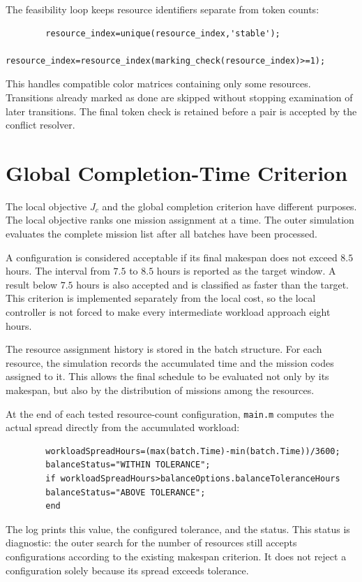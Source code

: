 The feasibility loop keeps resource identifiers separate from token counts:
\begin{small}
	\begin{verbatim}
		resource_index=unique(resource_index,'stable');
		resource_index=resource_index(marking_check(resource_index)>=1);
	\end{verbatim}
\end{small}
This handles compatible color matrices containing only some resources.
Transitions already marked as done are skipped without stopping examination
of later transitions. The final token check is retained before a pair is
accepted by the conflict resolver.

\section{Global Completion-Time Criterion}

The local objective $J_c$ and the global completion criterion have different
purposes. The local objective ranks one mission assignment at a time. The
outer simulation evaluates the complete mission list after all batches have
been processed.

A configuration is considered acceptable if its final makespan does not
exceed $8.5$ hours. The interval from $7.5$ to $8.5$ hours is reported as the
target window. A result below $7.5$ hours is also accepted and is classified
as faster than the target. This criterion is implemented separately from the
local cost, so the local controller is not forced to make every intermediate
workload approach eight hours.

The resource assignment history is stored in the batch structure. For each
resource, the simulation records the accumulated time and the mission codes
assigned to it. This allows the final schedule to be evaluated not only by
its makespan, but also by the distribution of missions among the resources.

At the end of each tested resource-count configuration, \texttt{main.m}
computes the actual spread directly from the accumulated workload:
\begin{small}
	\begin{verbatim}
		workloadSpreadHours=(max(batch.Time)-min(batch.Time))/3600;
		balanceStatus="WITHIN TOLERANCE";
		if workloadSpreadHours>balanceOptions.balanceToleranceHours
		balanceStatus="ABOVE TOLERANCE";
		end
	\end{verbatim}
\end{small}
The log prints this value, the configured tolerance, and the status. This
status is diagnostic: the outer search for the number of resources still
accepts configurations according to the existing makespan criterion. It
does not reject a configuration solely because its spread exceeds tolerance.

